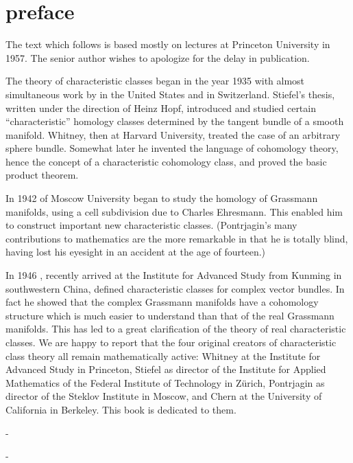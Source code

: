 \documentclass[../main]{subfiles}
\begin{document}
\chapter*{preface}

The text which follows is based mostly on lectures at Princeton
University in 1957. The senior author wishes to apologize for the delay
in publication.

The theory of characteristic classes began in the year 1935 with almost
simultaneous work by  in the United States and
 in Switzerland. Stiefel's thesis, written under the
direction of Heinz Hopf, introduced and studied certain ``characteristic''
homology classes determined by the tangent bundle of a smooth manifold.
Whitney, then at Harvard University, treated the case of an arbitrary sphere
bundle. Somewhat later he invented the language of cohomology theory,
hence the concept of a characteristic cohomology class, and proved the
basic product theorem.

In 1942  of Moscow University began to study the
homology of Grassmann manifolds, using a cell subdivision due to Charles
Ehresmann. This enabled him to construct important new characteristic
classes. (Pontrjagin's many contributions to mathematics are the more
remarkable in that he is totally blind, having lost his eyesight in an accident at the age of fourteen.)

In 1946 , recently arrived at the Institute for
Advanced Study from Kunming in southwestern China, defined characteristic classes for complex vector bundles. In fact he showed that the complex Grassmann manifolds have a cohomology structure which is much
easier to understand than that of the real Grassmann manifolds. This has
led to a great clarification of the theory of real characteristic classes.
We are happy to report that the four original creators of characteristic
class theory all remain mathematically active: Whitney at the Institute
for Advanced Study in Princeton, Stiefel as director of the Institute for
Applied Mathematics of the Federal Institute of Technology in Z\"urich,
Pontrjagin as director of the Steklov Institute in Moscow, and Chern at
the University of California in Berkeley. This book is dedicated to them.

\hfill -

\hfill -  
\end{document}
